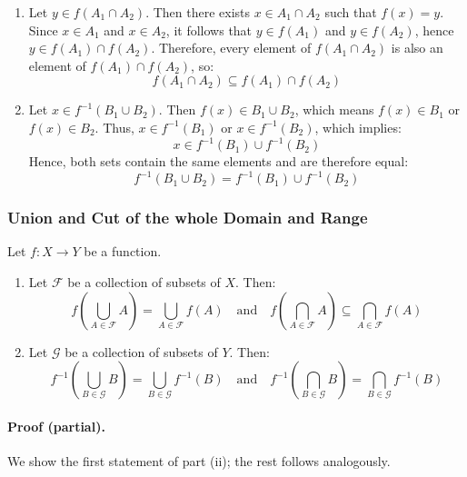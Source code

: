 \begin{enumerate}
	\item Let \( y \in f(A_1 \cap A_2) \). Then there exists \( x \in A_1 \cap A_2 \) such that \( f(x) = y \). Since \( x \in A_1 \) and \( x \in A_2 \), it follows that \( y \in f(A_1) \) and \( y \in f(A_2) \), hence \( y \in f(A_1) \cap f(A_2) \). Therefore, every element of \( f(A_1 \cap A_2) \) is also an element of \( f(A_1) \cap f(A_2) \), so:
	      \[
		      f(A_1 \cap A_2) \subseteq f(A_1) \cap f(A_2)
	      \]

	\item Let \( x \in f^{-1}(B_1 \cup B_2) \). Then \( f(x) \in B_1 \cup B_2 \), which means \( f(x) \in B_1 \) or \( f(x) \in B_2 \). Thus, \( x \in f^{-1}(B_1) \) or \( x \in f^{-1}(B_2) \), which implies:
	      \[
		      x \in f^{-1}(B_1) \cup f^{-1}(B_2)
	      \]
	      Hence, both sets contain the same elements and are therefore equal:
	      \[
		      f^{-1}(B_1 \cup B_2) = f^{-1}(B_1) \cup f^{-1}(B_2)
	      \]
\end{enumerate}

\subsubsection{Union and Cut of the whole Domain and Range}
Let \( f : X \to Y \) be a function.
\begin{enumerate}[label=\roman*]
	\item Let \( \mathcal{F} \) be a collection of subsets of \( X \). Then:
	      \[
		      f\left( \bigcup_{A \in \mathcal{F}} A \right) = \bigcup_{A \in \mathcal{F}} f(A)
		      \quad \text{and} \quad
		      f\left( \bigcap_{A \in \mathcal{F}} A \right) \subseteq \bigcap_{A \in \mathcal{F}} f(A)
	      \]

	\item Let \( \mathcal{G} \) be a collection of subsets of \( Y \). Then:
	      \[
		      f^{-1}\left( \bigcup_{B \in \mathcal{G}} B \right) = \bigcup_{B \in \mathcal{G}} f^{-1}(B)
		      \quad \text{and} \quad
		      f^{-1}\left( \bigcap_{B \in \mathcal{G}} B \right) = \bigcap_{B \in \mathcal{G}} f^{-1}(B)
	      \]
\end{enumerate}

\paragraph{Proof (partial).}
We show the first statement of part (ii); the rest follows analogously.

